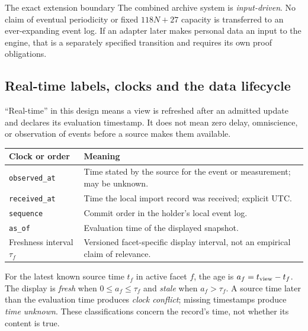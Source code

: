 \documentclass[11pt,a4paper]{article}
\newcommand{\newpagehead}[1]{\clearpage\subsection{#1}}
\begin{document}
\begin{note}{The exact extension boundary}
The combined archive system is \emph{input-driven}. No claim of eventual periodicity or fixed $118N+27$ capacity is transferred to an ever-expanding event log. If an adapter later makes personal data an input to the engine, that is a separately specified transition and requires its own proof obligations.
\end{note}

\newpagehead{Real-time labels, clocks and the data lifecycle}
``Real-time'' in this design means a view is refreshed after an admitted update and declares its evaluation timestamp. It does not mean zero delay, omniscience, or observation of events before a source makes them available.

\begin{center}\small\begin{tabularx}{\textwidth}{@{}p{}X@{}}\toprule
\textbf{Clock or order} & \textbf{Meaning}\\\midrule
\texttt{observed\_at} & Time stated by the source for the event or measurement; may be unknown.\\[5pt]
\texttt{received\_at} & Time the local import record was received; explicit UTC.\\[5pt]
\texttt{sequence} & Commit order in the holder's local event log.\\[5pt]
\texttt{as\_of} & Evaluation time of the displayed snapshot.\\[5pt]
Freshness interval $\tau_f$ & Versioned facet-specific display interval, not an empirical claim of relevance.\\\bottomrule
\end{tabularx}\end{center}

For the latest known source time $t_f$ in active facet $f$, the age is $a_f=t_{\rm view}-t_f$. The display is \emph{fresh} when $0\le a_f\le\tau_f$ and \emph{stale} when $a_f>\tau_f$. A source time later than the evaluation time produces \emph{clock conflict}; missing timestamps produce \emph{time unknown}. These classifications concern the record's time, not whether its content is true.
\end{document}
